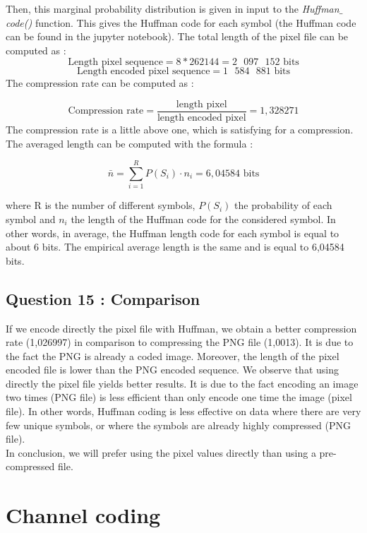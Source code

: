 \documentclass[titlepage]{article}
\begin{document}
Then, this marginal probability distribution is given in input to the \textit{Huffman$\_$code()} function. This gives the Huffman code for each symbol (the Huffman code can be found in the jupyter notebook). The total length of the pixel file can be computed as : 
$$ \text{Length pixel sequence} = 8 * 262 144= 2 \text{ } 097 \text{ } 152 \text{ bits}$$
$$ \text{Length encoded pixel sequence} =  1\text{ } 584 \text{ } 881 \text{ bits}$$ 
The compression rate can be computed as : 

$$ \text{Compression rate} = \frac{\text{length pixel}}{\text{length encoded pixel}} = 1,328271$$ 
The compression rate is a little above one, which is satisfying for a compression. The averaged length can be computed with the formula : 

$$\bar{n}=\sum_{i=1}^R P\left(S_i\right) \cdot n_i= 6,04584 \text{ bits}$$

where R is the number of different symbols, $P(S_i)$ the probability of each symbol and $n_i$ the length of the Huffman code for the considered symbol. In other words, in average, the Huffman length code for each symbol is equal to about 6 bits.  The empirical average length is the same and is equal to 6,04584 bits. \\

\subsection{Question 15 : Comparison}

If we encode directly the pixel file with Huffman, we obtain a better compression rate (1,026997) in comparison to compressing the PNG file (1,0013). It is due to the fact the PNG is already a coded image. 
Moreover, the length of the pixel encoded file is lower than the PNG encoded sequence. We observe that using directly the pixel file yields better results. It is due to the fact encoding an image two times (PNG file) is less efficient than only encode one time the image (pixel file). In other words, Huffman coding is less effective on data where there are very few unique symbols, or where the symbols are already highly compressed (PNG file). \\

In conclusion, we will prefer using the pixel values directly than using a pre-compressed file. 

\section{Channel coding}
\end{document}
